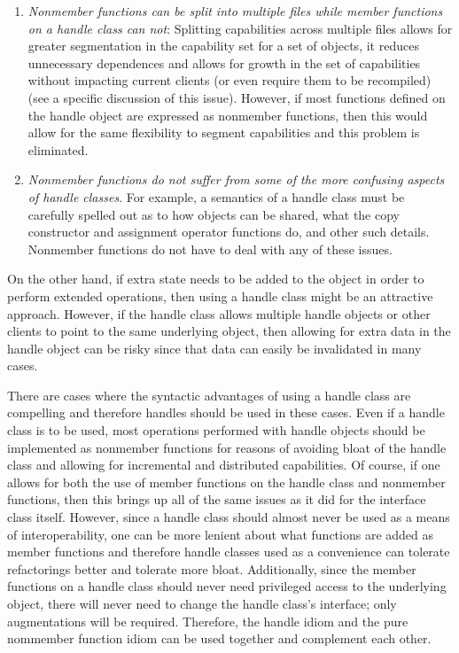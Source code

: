 \documentclass[pdf,ps2pdf,11pt]{SANDreport}
\begin{document}
\begin{enumerate}

{}\item{}\textit{Nonmember functions can be split into multiple files while
member functions on a handle class can not}: Splitting capabilities across
multiple files allows for greater segmentation in the capability set for a set
of objects, it reduces unnecessary dependences and allows for growth in the
set of capabilities without impacting current clients (or even require them to
be recompiled) (see {}\cite[Item 23]{EffectiveC++3rd} a specific discussion of
this issue).  However, if most functions defined on the handle object are
expressed as nonmember functions, then this would allow for the same
flexibility to segment capabilities and this problem is eliminated.

{}\item{}\textit{Nonmember functions do not suffer from some of the more
confusing aspects of handle classes}.  For example, a semantics of a handle
class must be carefully spelled out as to how objects can be shared, what the
copy constructor and assignment operator functions do, and other such details.
Nonmember functions do not have to deal with any of these issues.

\end{enumerate}

On the other hand, if extra state needs to be added to the object in order to
perform extended operations, then using a handle class might be an attractive
approach.  However, if the handle class allows multiple handle objects or
other clients to point to the same underlying object, then allowing for extra
data in the handle object can be risky since that data can easily be
invalidated in many cases.

There are cases where the syntactic advantages of using a handle class are
compelling and therefore handles should be used in these cases.  Even if a
handle class is to be used, most operations performed with handle objects
should be implemented as nonmember functions for reasons of avoiding bloat of
the handle class and allowing for incremental and distributed capabilities.
Of course, if one allows for both the use of member functions on the handle
class and nonmember functions, then this brings up all of the same issues as
it did for the interface class itself.  However, since a handle class should
almost never be used as a means of interoperability, one can be more lenient
about what functions are added as member functions and therefore handle
classes used as a convenience can tolerate refactorings better and tolerate
more bloat.  Additionally, since the member functions on a handle class should
never need privileged access to the underlying object, there will never need
to change the handle class's interface; only augmentations will be required.
Therefore, the handle idiom and the pure nommember function idiom can be used
together and complement each other.

\begin{SANDdistribution}[NM]
\end{SANDdistribution}
\end{document}
